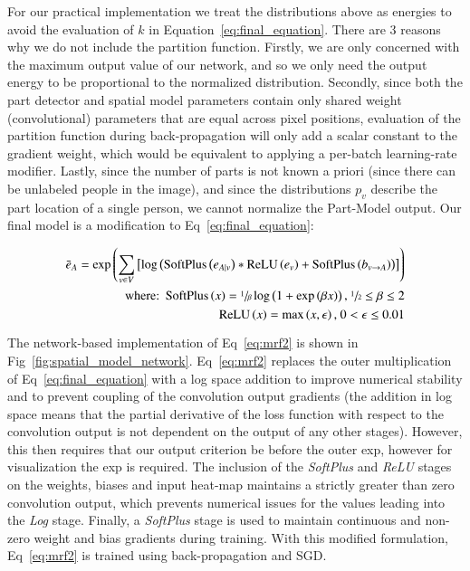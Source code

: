 For our practical implementation we treat the distributions above as energies to avoid the evaluation of $k$ in Equation~\ref{eq:final_equation}. There are 3 reasons why we do not include the partition function. Firstly, we are only concerned with the maximum output value of our network, and so we only need the output energy to be proportional to the normalized distribution. Secondly, since both the part detector and spatial model parameters contain only shared weight (convolutional) parameters that are equal across pixel positions, evaluation of the partition function during back-propagation will only add a scalar constant to the gradient weight, which would be equivalent to applying a per-batch learning-rate modifier. Lastly, since the number of parts is not known a priori (since there can be unlabeled people in the image), and since the distributions $p_v$ describe the part location of a single person, we cannot normalize the Part-Model output. Our final model is a modification to Eq~\ref{eq:final_equation}:

\begin{align}
\label{eq:mrf2}
\bar{e}_A = \operatorname{exp}\left(\sum_{v\in V}\left[\operatorname{log}\left(\operatorname{SoftPlus}\left(e_{A|v}\right) \ast \operatorname{ReLU}\left(e_v\right) + \operatorname{SoftPlus}\left(b_{v\rightarrow A}\right)\right)\right]\right) \\
\text{where: } \operatorname{SoftPlus}\left(x\right) = \sfrac{1}{\beta} \operatorname{log}\left(1+\operatorname{exp}\left(\beta x\right)\right)\text{, } \sfrac{1}{2} \leq\beta\leq 2 \notag \\
\operatorname{ReLU}\left(x\right) = \operatorname{max}\left(x, \epsilon \right)\text{, } 0<\epsilon\leq 0.01\notag
\end{align}

The network-based implementation of Eq~\ref{eq:mrf2} is shown in Fig~\ref{fig:spatial_model_network}. Eq~\ref{eq:mrf2} replaces the outer multiplication of Eq~\ref{eq:final_equation} with a log space addition to improve numerical stability and to prevent coupling of the convolution output gradients (the addition in log space means that the partial derivative of the loss function with respect to the convolution output is not dependent on the output of any other stages). However, this then requires that our output criterion be before the outer exp, however for visualization the exp is required. The inclusion of the \emph{SoftPlus} and \emph{ReLU} stages on the weights, biases and input heat-map maintains a strictly greater than zero convolution output, which prevents numerical issues for the values leading into the \emph{Log} stage. Finally, a \emph{SoftPlus} stage is used to maintain continuous and non-zero weight and bias gradients during training. With this modified formulation, Eq~\ref{eq:mrf2} is trained using back-propagation and SGD.

